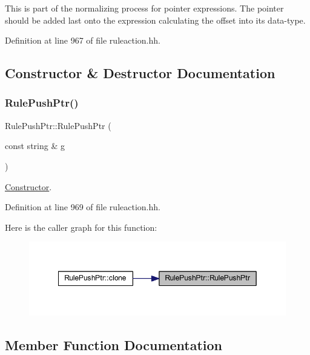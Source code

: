 This is part of the normalizing process for pointer expressions. The pointer should be added last onto the expression calculating the offset into its data-\/type. 

Definition at line 967 of file ruleaction.\+hh.



\subsection{Constructor \& Destructor Documentation}
\mbox{\label{class_rule_push_ptr_a8e5a85fa15fb847590ad04b52c83b609}} 
\subsubsection{\texorpdfstring{RulePushPtr()}{RulePushPtr()}}
{\footnotesize\ttfamily Rule\+Push\+Ptr\+::\+Rule\+Push\+Ptr (\begin{DoxyParamCaption}\item[{const string \&}]{g }\end{DoxyParamCaption})\hspace{0.3cm}{\ttfamily [inline]}}



\mbox{\hyperlink{class_constructor}{Constructor}}. 



Definition at line 969 of file ruleaction.\+hh.

Here is the caller graph for this function\+:
\nopagebreak
\begin{figure}[H]
\begin{center}
\leavevmode
\includegraphics[width=349pt]{class_rule_push_ptr_a8e5a85fa15fb847590ad04b52c83b609_icgraph}
\end{center}
\end{figure}


\subsection{Member Function Documentation}
\mbox{\label{class_rule_push_ptr_a6785d1d9de50ecb56918711aa413d7dc}} 
